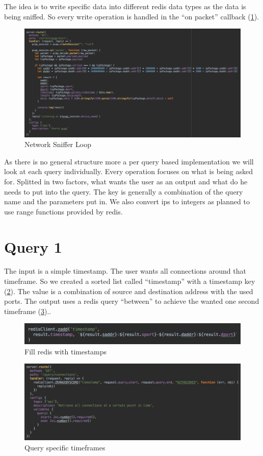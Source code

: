 The idea is to write specific data into different redis data types as the data is being sniffed. So every write operation is handled in the “on packet” callback (\ref{loop}).
  \begin{figure}[H]
	\centerline{\includegraphics[width=1.0\textwidth]{resources/solution2-1.png}}
	\caption{Network Sniffer Loop}
		\label{loop}
\end{figure}
As there is no general structure more a per query based implementation we will look at each query individually. Every operation focuses on what is being asked for. Splitted in two factors, what wants the user as an output and what do he needs to put into the query. The key is generally a combination of the query name and the parameters put in. We also convert ips to integers as planned to use range functions provided by redis.

\section{Query 1}
The input is a simple timestamp. The user wants all connections around that timeframe. So we created a sorted list called “timestamp” with a timestamp key (\ref{query1}). The value is a combination of source and destination address with the used ports. The output uses a redis query “between” to achieve the wanted one second timeframe (\ref{query11})..

  \begin{figure}[H]
	\centerline{\includegraphics[width=1.0\textwidth]{resources/solution2-2.png}}
	\caption{Fill redis with timestamps}
	\label{query1}
\end{figure}

  \begin{figure}[H]
	\centerline{\includegraphics[width=1.0\textwidth]{resources/solution2-3.png}}
	\caption{Query specific timeframes}
	\label{query11}
\end{figure}

